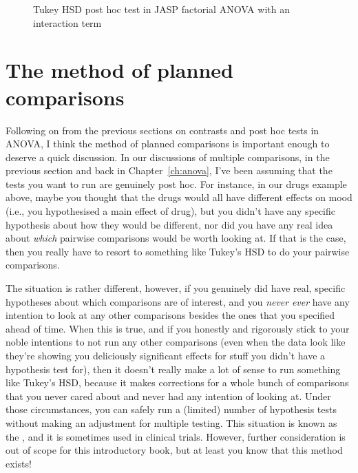 \begin{figure}[!htb]
\begin{center}
\caption{Tukey HSD post hoc test in JASP factorial ANOVA with an interaction term}
\label{fig:factorialanova14}
\HR
\end{center}
\end{figure}


\section{The method of planned comparisons\label{sec:plannedcomparisons}}

Following on from the previous sections on contrasts and post hoc tests in ANOVA, I think the method of planned comparisons is important enough to deserve a quick discussion. In our discussions of multiple comparisons, in the previous section and back in Chapter~\ref{ch:anova}, I've been assuming that the tests you want to run are genuinely post hoc. For instance, in our drugs example above, maybe you thought that the drugs would all have different effects on mood (i.e., you hypothesised a main effect of drug), but you didn't have any specific hypothesis about how they would be different, nor did you have any real idea about {\it which} pairwise comparisons would be worth looking at. If that is the case, then you really have to resort to something like Tukey's HSD to do your pairwise comparisons.

The situation is rather different, however, if you genuinely did have real, specific hypotheses about which comparisons are of interest, and you {\it never} {\it ever} have any intention to look at any other comparisons besides the ones that you specified ahead of time. When this is true, and if you honestly and rigorously stick to your noble intentions to not run any other comparisons (even when the data look like they're showing you deliciously significant effects for stuff you didn't have a hypothesis test for), then it doesn't really make a lot of sense to run something like Tukey's HSD, because it makes corrections for a whole bunch of comparisons that you never cared about and never had any intention of looking at. Under those circumstances, you can safely run a (limited) number of hypothesis tests without making an adjustment for multiple testing. This situation is known as the , and it is sometimes used in clinical trials. However, further consideration is out of scope for this introductory book, but at least you know that this method exists! 


